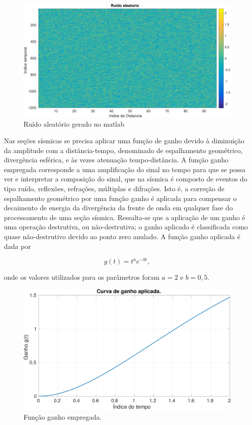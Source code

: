 \begin{figure}[H]
\centering
\includegraphics[totalheight=7.0cm]{figuras/cap2/ruido_aletorio.pdf}
\caption{Ruído aleatório gerado no matlab}
\label{fig:ruido_aletorio}
\end{figure}

Nas seções sísmicas se precisa aplicar uma função de ganho devido à diminuição da amplitude com a distância-tempo, denominado de  espalhamento geométrico, divergência esférica, e às vezes atenuação tempo-distância. 
A função ganho empregada corresponde a uma amplificação do sinal no tempo para que se possa ver e interpretar a composição do sinal, que na sísmica é composto de eventos do tipo ruído, reflexões, refrações, múltiplas e difrações. 
Isto é, a correção de espalhamento geométrico por uma função ganho é aplicada para compensar o decaimento de energia da divergência da frente de onda em qualquer fase do processamento de uma seção sísmica. 
Ressalta-se que a aplicação de um ganho é uma operação destrutiva, ou não-destrutiva; o ganho aplicado é classificada como quase não-destrutivo devido ao ponto zero anulado.
A função ganho aplicada é dada por 

\begin{equation}
g(t)=t^{a}e^{-bt},
\label{eq:figura_ganho}
\end{equation}

onde os valores utilizados para os parâmetros foram $a=2$ e $b=0,5$.

\begin{figure}[H]
\centering
\includegraphics[totalheight=7.0cm]{figuras/cap2/figura_ganho.pdf}
\caption{Função ganho empregada.}
\label{fig:figura_ganho}
\end{figure}

